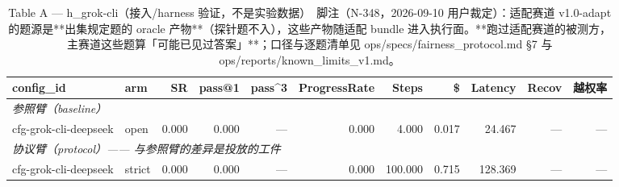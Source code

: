 \begin{table}[t]
\centering
\caption{Table A — h\_grok-cli（接入/harness 验证，不是实验数据）　脚注（N-348，2026-09-10 用户裁定）：适配赛道 v1.0-adapt 的题源是**出集规定题的 oracle 产物**（探针题不入），这些产物随适配 bundle 进入执行面。**跑过适配赛道的被测方，主赛道这些题算「可能已见过答案」**；口径与逐题清单见 ops/specs/fairness\_protocol.md §7 与 ops/reports/known\_limits\_v1.md。}
\label{tab:a-h_grok-cli}
\begin{tabular}{llrrrrrrrrr}
\toprule
config\_id & arm & SR & pass@1 & pass\^{}3 & ProgressRate & Steps & \$ & Latency & Recov & 越权率 \\
\midrule
\multicolumn{11}{l}{\textit{参照臂（baseline）}} \\
cfg-grok-cli-deepseek & open & 0.000 & 0.000 & --- & 0.000 & 4.000 & 0.017 & 24.467 & --- & --- \\
\midrule
\multicolumn{11}{l}{\textit{协议臂（protocol）—— 与参照臂的差异是投放的工件}} \\
cfg-grok-cli-deepseek & strict & 0.000 & 0.000 & --- & 0.000 & 100.000 & 0.715 & 128.369 & --- & --- \\
\bottomrule
\end{tabular}
\end{table}

